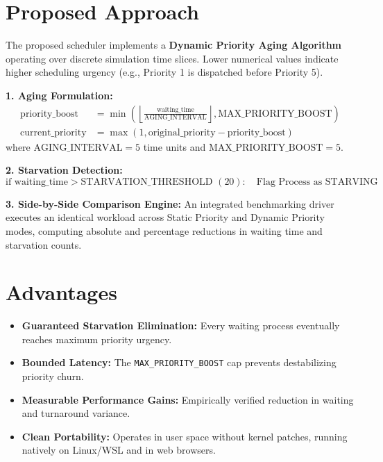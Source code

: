 \documentclass[12pt,a4paper]{report}
\begin{document}
\section{Proposed Approach}
The proposed scheduler implements a \textbf{Dynamic Priority Aging Algorithm} operating over discrete simulation time slices. Lower numerical values indicate higher scheduling urgency (e.g., Priority 1 is dispatched before Priority 5).

\textbf{1. Aging Formulation:}
\begin{align}
\text{priority\_boost} &= \min\left(\left\lfloor \frac{\text{waiting\_time}}{\text{AGING\_INTERVAL}} \right\rfloor, \text{MAX\_PRIORITY\_BOOST}\right) \\
\text{current\_priority} &= \max\left(1, \text{original\_priority} - \text{priority\_boost}\right)
\end{align}
where $\text{AGING\_INTERVAL} = 5$ time units and $\text{MAX\_PRIORITY\_BOOST} = 5$.

\textbf{2. Starvation Detection:}
\begin{equation}
\text{if } \text{waiting\_time} > \text{STARVATION\_THRESHOLD } (20): \quad \text{Flag Process as STARVING}
\end{equation}

\textbf{3. Side-by-Side Comparison Engine:}
An integrated benchmarking driver executes an identical workload across Static Priority and Dynamic Priority modes, computing absolute and percentage reductions in waiting time and starvation counts.

\section{Advantages}
\begin{itemize}[leftmargin=1.5em, itemsep=2pt]
  \item \textbf{Guaranteed Starvation Elimination:} Every waiting process eventually reaches maximum priority urgency.
  \item \textbf{Bounded Latency:} The \texttt{MAX\_PRIORITY\_BOOST} cap prevents destabilizing priority churn.
  \item \textbf{Measurable Performance Gains:} Empirically verified reduction in waiting and turnaround variance.
  \item \textbf{Clean Portability:} Operates in user space without kernel patches, running natively on Linux/WSL and in web browsers.
\end{itemize}
\end{document}
